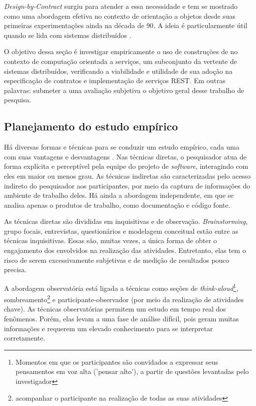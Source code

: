 \textit{Design-by-Contract} surgiu para atender a essa necessidade e tem se
mostrado como uma abordagem efetiva no contexto de orientação a objetos desde
suas primeiras experimentações \cite{jazequel1997design} ainda na década de
90. A ideia é particularmente útil quando se lida com sistemas distribuídos
\cite{arnout2001net}. 

O objetivo dessa seção é investigar empiricamente o uso de construções de
\designbycontract{} no contexto de computação orientada a serviços, um
subconjunto da vertente de sistemas distribuídos, verificando a viabilidade e
utilidade de sua adoção na especificação de contratos e implementação de
serviços REST. Em outras palavras: submeter a uma avaliação subjetiva o objetivo
geral desse trabalho de pesquisa.

\subsection{Planejamento do estudo empírico}

Há diversas formas e técnicas para se conduzir um estudo empírico, cada uma com
suas vantagens e desvantagens \cite{shull2008guide}. Nas técnicas diretas, o pesquisador
atua de forma explícita e perceptível pela equipe do projeto de \textit{software}, interagindo
com eles em maior ou menos grau. As técnicas indiretas são caracterizadas pelo
acesso indireto do pesquisador aos participantes, por meio da captura de
informações do ambiente de trabalho deles. Há ainda a abordagem independente,
em que se analisa apenas o produtos de trabalho, como documentação e código
fonte.

As técnicas diretas são divididas em inquisitivas e de observação.
\textit{Brainstorming}, grupo focais, entrevistas, questionários e modelagem
conceitual estão entre as técnicas inquisitivas. Essas são, muitas vezes, a
única forma de obter o engajamento dos envolvidos na realização das atividades.
Entretanto, elas tem o risco de serem excessivamente subjetivas e de medição de
resultados pouco precisa.

A abordagem observatória está ligada a técnicas como seções de
\textit{think-aloud}\footnote{Momentos em que os participantes são
convidados a expressar seus pensamentos em voz alta ('pensar alto'), a partir de
questões levantadas pelo investigador}, sombreamento\footnote{acompanhar o
participante na realização de todas as suas atividades} e
participante-observador (por meio da realização de atividades chave). As técnicas observatórias permitem
um estudo em tempo real dos fenômenos. Porém, elas levam a uma fase de análise
difícil, pois geram muitas informações e requerem um elevado conhecimento para
se interpretar corretamente.

